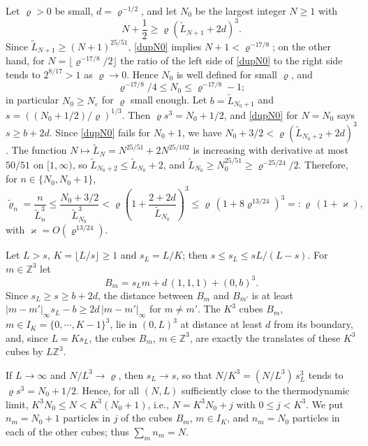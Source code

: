 \documentclass[11pt]{article}
\numberwithin{equation}{section}
\newcommand{\e}{\varepsilon}
\newcommand{\beq}{\begin{equation}}
\newcommand{\eeq}{\end{equation}}
\newcommand\Z{{\mathbb Z}}
\renewcommand\kappa\varkappa
\renewcommand\rho\varrho
\theoremstyle{definition}
\begin{document}
\smallskip{}
Let $\rho>0$ be small, $d=\rho^{-1/2}$, and let $N_0$ be the largest integer $N\geq1$ with
\beq\label{dupN0}
N+\frac12\geq\rho\left(\widetilde L_{N+1}+2d\right)^3 .
\eeq
Since $\widetilde L_{N+1}\geq(N+1)^{25/51}$, \eqref{dupN0} implies $N+1<\rho^{-17/8}$; on the other hand, for $N=\lfloor\rho^{-17/8}/2\rfloor$ the ratio of the left side of \eqref{dupN0} to the right side tends to $2^{8/17}>1$ as $\rho\to0$.
Hence $N_0$ is well defined for small $\rho$, and
\[
\rho^{-17/8}/4\leq N_0\leq\rho^{-17/8}-1 ;
\]
in particular $N_0\geq N_\e$ for $\rho$ small enough. Let $b=\widetilde L_{N_0+1}$ and $s=((N_0+1/2)/\rho)^{1/3}$. Then $\rho s^3=N_0+1/2$, and \eqref{dupN0} for $N=N_0$ says $s\geq b+2d$.
Since \eqref{dupN0} fails for $N_0+1$, we have $N_0+3/2<\rho(\widetilde L_{N_0+2}+2d)^3$.
The function $N\mapsto\widetilde L_N=N^{25/51}+2N^{25/102}$ is increasing with derivative at most $50/51$ on $[1,\infty)$, so $\widetilde L_{N_0+2}\leq\widetilde L_{N_0}+2$, and $\widetilde L_{N_0}\geq N_0^{25/51}\geq\rho^{-25/24}/2$.
Therefore, for $n\in\{N_0,N_0+1\}$,
\beq\label{dupdensity}
\widetilde\rho_n=\frac{n}{\widetilde L_n^3}\leq\frac{N_0+3/2}{\widetilde L_{N_0}^3}<\rho\left(1+\frac{2+2d}{\widetilde L_{N_0}}\right)^3\leq\rho\,(1+8\rho^{13/24})^3=:\rho\,(1+\kappa),
\eeq
with $\kappa=O(\rho^{13/24})$.

\smallskip{}
Let $L>s$, $K=\lfloor L/s\rfloor\geq1$ and $s_L=L/K$; then $s\leq s_L\leq sL/(L-s)$. For $m\in\Z^3$ let
\[
B_m=s_Lm+d\,(1,1,1)+(0,b)^3 .
\]
Since $s_L\geq s\geq b+2d$, the distance between $B_m$ and $B_{m'}$ is at least $|m-m'|_\infty s_L-b\geq 2d\,|m-m'|_\infty$ for $m\neq m'$.
The $K^3$ cubes $B_m$, $m\in I_K=\{0,\cdots,K-1\}^3$, lie in $(0,L)^3$ at distance at least $d$ from its boundary, and, since $L=Ks_L$,
the cubes $B_m$, $m\in\Z^3$, are exactly the translates of these $K^3$ cubes by $L\Z^3$.

\smallskip{}
If $L\to\infty$ and $N/L^3\to\rho$, then $s_L\to s$, so that $N/K^3=(N/L^3)\,s_L^3$ tends to $\rho s^3=N_0+1/2$. Hence, for all $(N,L)$ sufficiently close to the thermodynamic limit,
$K^3N_0\leq N<K^3(N_0+1)$, i.e., $N=K^3N_0+j$ with $0\leq j<K^3$. We put $n_m=N_0+1$ particles in $j$ of the cubes $B_m$, $m\in I_K$, and $n_m=N_0$ particles in each of the other cubes; thus $\sum_mn_m=N$.
\end{document}
